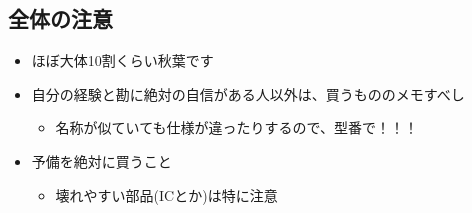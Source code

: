 \documentclass[letterpaper,10pt,dvipdfmx]{sphinxmanual}
\begin{document}
\subsection{全体の注意}
\label{\detokenize{buy_parts:}}\label{\detokenize{buy_parts:id4}}\begin{itemize}
\item {} 
ほぼ大体10割くらい秋葉です

\item {} 
自分の経験と勘に絶対の自信がある人以外は、買うもののメモすべし
\begin{itemize}
\item {} 
名称が似ていても仕様が違ったりするので、型番で！！！

\end{itemize}

\item {} 
予備を絶対に買うこと
\begin{itemize}
\item {} 
壊れやすい部品(ICとか)は特に注意

\end{itemize}

\end{itemize}
\end{document}
